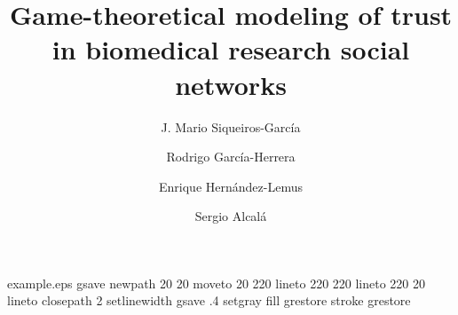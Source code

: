 %
%
%
%
%
\begin{filecontents*}{example.eps}
gsave
newpath
  20 20 moveto
  20 220 lineto
  220 220 lineto
  220 20 lineto
closepath
2 setlinewidth
gsave
  .4 setgray fill
grestore
stroke
grestore
\end{filecontents*}
%
\RequirePackage{fix-cm}
%
\documentclass[smallextended]{svjour3}       %
%
\smartqed  %
%
\usepackage{graphicx}
%
%
%
%
%


\title{Game-theoretical modeling of trust in biomedical research social networks%
}


\author{J. Mario Siqueiros-Garc\'ia         \and      Rodrigo Garc\'ia-Herrera \and         Enrique Hern\'andez-Lemus \and
        Sergio Alcal\'a  %
}


